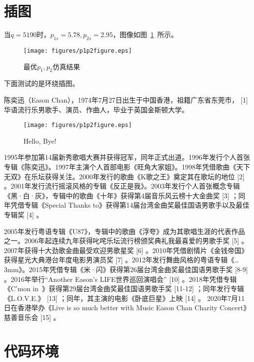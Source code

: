 \section{插图}

当$q=5190$时，$p_{1s}=5.78,p_{2s}=2.95$，图像如图~\ref{fig:simuP1P2Result}~所示。
\begin{figure}[htbp!]
\centering
\texttt{[image: figures/p1p2figure.eps]}
\caption{最优$p_1, p_2$仿真结果}\label{fig:simuP1P2Result}
\vspace{-1em}
\end{figure}


下面测试的是环绕插图。

陈奕迅（Eason Chan），1974年7月27日出生于中国香港，祖籍广东省东莞市， [1]  华语流行乐男歌手、演员、作曲人，毕业于英国金斯顿大学。

\begin{wrapfigure}{o}{0.5\textwidth}   %
  \begin{center}
    \texttt{[image: figures/p1p2figure.eps]}
  \end{center}
  \caption{Hello, Bye!}
\end{wrapfigure}

1995年参加第14届新秀歌唱大赛并获得冠军，同年正式出道。1996年发行个人首张专辑《陈奕迅》。1997年主演个人首部电影《旺角大家姐》。1998年凭借歌曲《天下无双》在乐坛获得关注。2000年发行的歌曲《K歌之王》奠定其在歌坛的地位 [2]  。2001年发行流行摇滚风格的专辑《反正是我》。2003年发行个人首张概念专辑《黑·白·灰》，专辑中的歌曲《十年》获得第4届音乐风云榜十大金曲奖 [3]  ；同年凭借专辑《Special Thanks to》获得第14届台湾金曲奖最佳国语男歌手以及最佳专辑奖 [4]  。

2005年发行粤语专辑《U87》，专辑中的歌曲《浮夸》成为其歌唱生涯的代表作品之一。2006年起连续九年获得叱咤乐坛流行榜颁奖典礼我最喜爱的男歌手奖 [5]  。2007年获得十大劲歌金曲最受欢迎男歌星奖 [6]  。2010年凭借剧情片《金钱帝国》获得星光大典港台年度电影男演员奖 [7]  。2012年发行舞曲风格的粤语专辑《…3mm》。2015年凭借专辑《米·闪》获得第26届台湾金曲奖最佳国语男歌手奖 [8-9]  。2016年举行“Another Eason's LIFE世界巡回演唱会” [10]  。2018年凭借专辑《C'mon in~》获得第29届台湾金曲奖最佳国语男歌手奖 [11-12]  ；同年发行专辑《L.O.V.E.》 [13]  ；同年，其主演的电影《卧底巨星》上映 [14]  。 2020年7月11日在香港举办《Live is so much better with Music Eason Chan Charity Concert》慈善音乐会 [15]  。

\section{代码环境}

